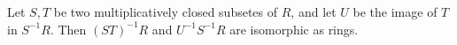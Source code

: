 Let $S, T$ be two multiplicatively closed subsetes of $R$, and let $U$ be
the image of $T$ in $S^{-1}R$. Then $(ST)^{-1}R$ and $U^{-1}S^{-1}R$ are
isomorphic as rings.
